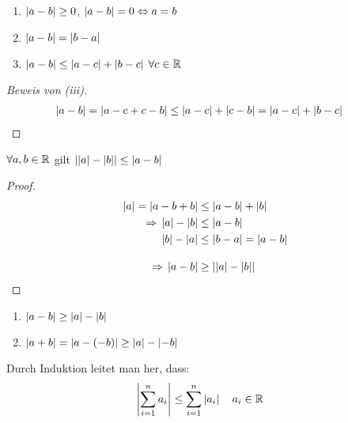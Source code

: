 \begin{satz}
    \label{satz:diff-abs}
    \theoremescape
    \begin{enumerate}[label=(\roman*)]
        \item $\left|a-b\right|\geq 0$, $\left|a-b\right| = 0\Leftrightarrow{} a = b$
        \item $\left|a-b\right| = \left|b-a\right|$
        \item $\left|a-b\right|\leq \left|a-c\right| + \left|b-c\right|$ $\forall c\in\mathbb{R}$ %
    \end{enumerate}
    \begin{proof}[Beweis von (iii)]
        \begin{align*}
            \left|a-b\right| &= \left|a-c+c-b\right| \leq \left|a-c\right|+\left|c-b\right| = \left|a-c\right|+\left|b-c\right|\qedhere
        \end{align*}
    \end{proof}
\end{satz}

\begin{satz} %
    $\forall a,b\in\mathbb{R}$ gilt $\left|\left|a\right|-\left|b\right|\right|\leq\left|a-b\right|$
    \begin{proof}
        \begin{align*}
            \left|a\right| = \left|a-b+b\right| &\leq \left|a-b\right| + \left|b\right|\\
            \Rightarrow{} \left|a\right|-\left|b\right| &\leq \left|a-b\right|\\
            \left|b\right|-\left|a\right| &\leq \left|b-a\right| = \left|a-b\right|\\[10pt]
            \Rightarrow{} \left|a-b\right|&\geq\left|\left|a\right|-\left|b\right|\right|\qedhere
        \end{align*}
    \end{proof}
\end{satz}

\begin{folgerung}
    \theoremescape
    \begin{enumerate}[label=(\roman*)]
        \item $\left|a-b\right|\geq \left|a\right|-\left|b\right|$
        \item $\left|a+b\right| = \left|a-\left(-b\right)\right| \geq \left|a\right| - \left|-b\right|$
    \end{enumerate}
\end{folgerung}

\begin{bemerkung}
    Durch Induktion leitet man her, dass:
    \begin{align*}
        \left|\sum_{i=1}^{n} a_i\right| &\leq \sum_{i=1}^{n} \left|a_i\right|\quad a_i \in\mathbb{R}
    \end{align*}
\end{bemerkung}

\newpage